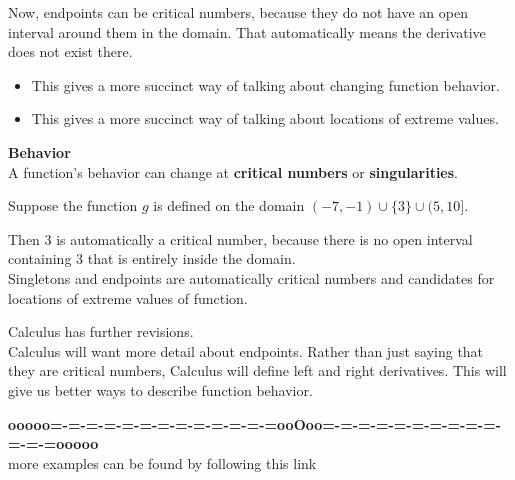 \documentclass{ximera}
\begin{document}
Now, endpoints can be critical numbers, because they do not have an open interval around them in the domain.  That automatically means the derivative does not exist there. \\






\begin{itemize}
\item This gives a more succinct way of talking about changing function behavior. 
\item This gives a more succinct way of talking about locations of extreme values. 
\end{itemize}




\begin{idea} \textbf{\textcolor{green!50!black}{Behavior}} \\


A function's behavior can change at \textbf{critical numbers} or \textbf{singularities}.






\end{idea}


\begin{example}


Suppose the function $g$ is defined on the domain $(-7, -1) \cup \{ 3 \} \cup (5, 10]$.

Then $3$ is automatically a critical number, because there is no open interval containing $3$ that is entirely inside the domain.\\


Singletons and endpoints are automatically critical numbers and candidates for locations of extreme values of function.


\end{example}



Calculus has further revisions.\\


Calculus will want more detail about endpoints.  Rather than just saying that they are critical numbers, Calculus will define left and right derivatives.  This will give us better ways to describe function behavior. \\











\begin{center}
\textbf{\textcolor{green!50!black}{ooooo=-=-=-=-=-=-=-=-=-=-=-=-=ooOoo=-=-=-=-=-=-=-=-=-=-=-=-=ooooo}} \\

more examples can be found by following this link\\ 

\end{center}
\end{document}
